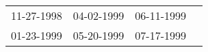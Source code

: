 \begin{supertabular}{llll}
 11-27-1998 &  04-02-1999 &  06-11-1999 \\
 01-23-1999 &  05-20-1999 &  07-17-1999 \\
\end{supertabular}
